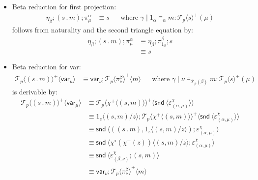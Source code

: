 \documentclass[10pt]{article}
\theoremstyle{definition}
\newcommand\dsd[1]{\ensuremath{\mathsf{#1}}}
\newcommand\TermTwoT[5]{\ensuremath{#1 \mid #3 \vDash_{#5} #2 : #4}}
\newcommand\TrPlus[2]{\ensuremath{{#1}^+(#2)}}
\newcommand\TrCirc[2]{\ensuremath{{#1}^\circ(#2)}}
\newcommand\var[1]{\ensuremath{\mathsf{var}_{#1}}}
\newcommand\El[2]{\mathcal{T}_{#1}(#2)}
\newcommand\ApEl[2]{\mathcal{T}_{#1}\langle#2\rangle}
\newcommand\ap[2]{\ensuremath{#1 \langle #2 \rangle }}
\newcommand\ApPlus[2]{\ensuremath{{#1}^+ \langle #2 \rangle }}
\newcommand\ApCirc[2]{\ensuremath{{#1}^\circ \langle #2 \rangle }}
\newcommand{\app}[2]{\ensuremath{#1 \: #2}}
\newcommand{\fst}[1]{\app{\dsd{fst}}{#1}}
\newcommand{\snd}[1]{\app{\dsd{snd}}{#1}}
\newcommand\bdot[0]{\mathbin{.}}
\begin{document}
\begin{itemize}
\item Beta reduction for first projection:
  \begin{align}
\label{beta-pi}
\eta_\beta;(s \bdot m);\pi^\alpha_\mu &\equiv s && \text{where } \TermTwoT{\gamma}{m}{1_\alpha}{\TrPlus{\ApEl{p}{s}}{\mu}}{\alpha}
  \end{align}
follows from naturality and the second triangle equation by:
\begin{align*}
\eta_\beta;(s \bdot m);\pi^\alpha_\mu
&\equiv \eta_\beta;\pi^\beta_{1_\beta};s \\
&\equiv s
\end{align*}

\item Beta reduction for var:
\begin{align}
\label{beta-var}
\ApPlus{\ApEl{p}{(s \bdot m)}}{\var{\mu}} &\equiv \var{\nu};\ApPlus{\ApEl{p}{\pi^\beta_\nu}}{m}  && \text{where } \TermTwoT{\gamma}{m}{\nu}{\TrPlus{\ApEl{p}{s}}{\mu}}{\El{p}{\beta}}
\end{align}
is derivable by:
\begin{align*}
\ApPlus{\ApEl{p}{(s \bdot m)}}{\var{\mu}} 
&\equiv \ApPlus{\ApEl{p}{\ApPlus{\chi}{(s, m)}}}{\ap \snd {\varepsilon^\chi_{(\alpha, \mu)}}} \\
&\equiv \ap{1_z}{(s, m)/z};\ApPlus{\ApEl{p}{\ApPlus{\chi}{(s, m)}}}{\ap \snd {\varepsilon^\chi_{(\alpha, \mu)}}} \\
&\equiv \ap \snd {((s \bdot m), \ap{1_z}{(s, m)/z});\varepsilon^\chi_{(\alpha, \mu)}} \\
&\equiv \ap \snd {\ap{\TrCirc{\chi}{\TrPlus{\chi}{z}}}{(s, m)/z};\varepsilon^\chi_{(\alpha, \mu)}} \\
&\equiv \ap \snd {\varepsilon^\chi_{(\beta, \nu)};(s, m)} \\
&\equiv \var{\nu}; \ApPlus{\ApEl{p}{\pi^\beta_{\nu}}}{m} \\
\end{align*}


\end{itemize}
\end{document}
